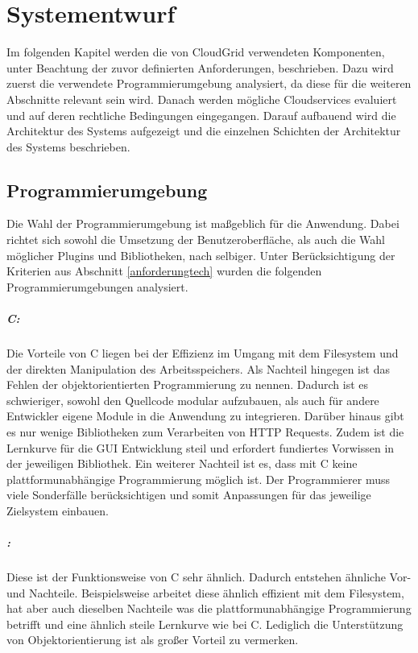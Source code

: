 \chapter{Systementwurf}
\label{systementwurf}
Im folgenden Kapitel werden die von CloudGrid verwendeten Komponenten, unter Beachtung der zuvor definierten Anforderungen, beschrieben.
Dazu wird zuerst die verwendete Programmierumgebung analysiert, da diese für die weiteren Abschnitte relevant sein wird.
Danach werden mögliche Cloudservices evaluiert und auf deren rechtliche Bedingungen eingegangen.
Darauf aufbauend wird die Architektur des Systems aufgezeigt und die einzelnen Schichten der Architektur des Systems beschrieben.

\section{Programmierumgebung}
\label{systementwurf-programmierumgebung}
Die Wahl der Programmierumgebung ist maßgeblich für die Anwendung.
Dabei richtet sich sowohl die Umsetzung der Benutzeroberfläche, als auch die Wahl möglicher Plugins und Bibliotheken, nach selbiger.
Unter Berücksichtigung der Kriterien aus Abschnitt \ref{anforderungtech} wurden die folgenden Programmierumgebungen analysiert.

\paragraph{C:}
Die Vorteile von C liegen bei der Effizienz im Umgang mit dem Filesystem und der direkten Manipulation des Arbeitsspeichers.
Als Nachteil hingegen ist das Fehlen der objektorientierten Programmierung zu nennen.
Dadurch ist es schwieriger, sowohl den Quellcode modular aufzubauen, als auch für andere Entwickler eigene Module in die Anwendung zu integrieren.
Darüber hinaus gibt es nur wenige Bibliotheken zum Verarbeiten von \ac{HTTP} Requests.
Zudem ist die Lernkurve für die \ac{GUI} Entwicklung steil und erfordert fundiertes Vorwissen in der jeweiligen Bibliothek.
Ein weiterer Nachteil ist es, dass mit C keine plattformunabhängige Programmierung möglich ist.
Der Programmierer muss viele Sonderfälle berücksichtigen und somit Anpassungen für das jeweilige Zielsystem einbauen.

\paragraph{\cpp :}
Diese ist der Funktionsweise von C sehr ähnlich.
Dadurch entstehen ähnliche Vor- und Nachteile.
Beispielsweise arbeitet diese ähnlich effizient mit dem Filesystem, hat aber auch dieselben Nachteile was die plattformunabhängige Programmierung betrifft und eine ähnlich steile Lernkurve wie bei C.
Lediglich die Unterstützung von Objektorientierung ist als großer Vorteil zu vermerken.

